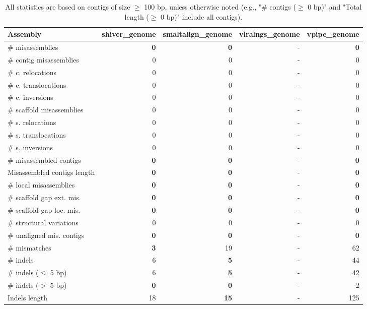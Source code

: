 \documentclass[12pt,a4paper]{article}
\begin{document}
\begin{table}[ht]
\begin{center}
\caption{All statistics are based on contigs of size $\geq$ 100 bp, unless otherwise noted (e.g., "\# contigs ($\geq$ 0 bp)" and "Total length ($\geq$ 0 bp)" include all contigs).}
\begin{tabular}{|l*{4}{|r}|}
\hline
Assembly & shiver\_genome & smaltalign\_genome & viralngs\_genome & vpipe\_genome \\ \hline
\# misassemblies & {\bf 0} & {\bf 0} & - & {\bf 0} \\ \hline
\hspace{2mm}\# contig misassemblies & 0 & 0 & - & 0 \\ \hline
\hspace{5mm}\# c. relocations & 0 & 0 & - & 0 \\ \hline
\hspace{5mm}\# c. translocations & 0 & 0 & - & 0 \\ \hline
\hspace{5mm}\# c. inversions & 0 & 0 & - & 0 \\ \hline
\hspace{2mm}\# scaffold misassemblies & 0 & 0 & - & 0 \\ \hline
\hspace{5mm}\# s. relocations & 0 & 0 & - & 0 \\ \hline
\hspace{5mm}\# s. translocations & 0 & 0 & - & 0 \\ \hline
\hspace{5mm}\# s. inversions & 0 & 0 & - & 0 \\ \hline
\# misassembled contigs & {\bf 0} & {\bf 0} & - & {\bf 0} \\ \hline
Misassembled contigs length & {\bf 0} & {\bf 0} & - & {\bf 0} \\ \hline
\# local misassemblies & {\bf 0} & {\bf 0} & - & {\bf 0} \\ \hline
\# scaffold gap ext. mis. & {\bf 0} & {\bf 0} & - & {\bf 0} \\ \hline
\# scaffold gap loc. mis. & {\bf 0} & {\bf 0} & - & {\bf 0} \\ \hline
\# structural variations & 0 & 0 & - & 0 \\ \hline
\# unaligned mis. contigs & {\bf 0} & {\bf 0} & - & {\bf 0} \\ \hline
\# mismatches & {\bf 3} & 19 & - & 62 \\ \hline
\# indels & 6 & {\bf 5} & - & 44 \\ \hline
\hspace{5mm}\# indels ($\leq$ 5 bp) & 6 & {\bf 5} & - & 42 \\ \hline
\hspace{5mm}\# indels ($>$ 5 bp) & {\bf 0} & {\bf 0} & - & 2 \\ \hline
Indels length & 18 & {\bf 15} & - & 125 \\ \hline
\end{tabular}
\end{center}
\end{table}
\end{document}
